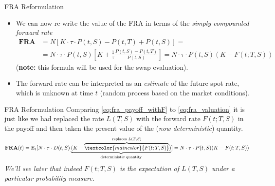 \documentclass{beamer}
\begin{document}
\begin{frame}{FRA Reformulation}
	\begin{itemize}
		\item We can now re-write the value of the FRA in terms of the \emph{simply-compounded forward rate}
		\begin{equation}
			\begin{aligned}
				\textbf{FRA}&=N[K\cdot\tau\cdot P(t,S)-P(t,T)+P(t,S)] = \\
				&=N\cdot\tau\cdot P(t,S) \left[K +\frac{1}{\tau} \frac{P(t,S)-P(t,T)}{P(t,S)}\right] = N\cdot\tau\cdot P(t,S)(K-F(t;T,S))
			\end{aligned}
			\label{eq:fra_payoff_withF}
		\end{equation}
		(\textbf{note:} this formula will be used for the swap evaluation).
		\item<2-> \textcolor{maincolor}{The forward rate can be interpreted as an \emph{estimate} of the future spot rate}, which is unknown at time $t$ (random process based on the market conditions).
	\end{itemize}
\end{frame}

\begin{frame}{FRA Reformulation}
	Comparing \cref{eq:fra_payoff_withF} to \cref{eq:fra_valuation} it is just like we had replaced the rate $L(T,S)$ with the forward rate $F(t;T,S)$ in the payoff and then taken the present value of the (\emph{now deterministic}) quantity.
	\begin{equation*}
		\textbf{FRA}(t) = \mathbb{E}_t [ N\cdot \tau\cdot D(t,S) \underbrace{(K - \overbrace{\textcolor{maincolor}{F(t; T, S)}}^{\text{replaces } L(T,S)})}_{\text{deterministic quantity}}] = N\cdot \tau\cdot P(t,S) (K - F(t; T, S))
	\end{equation*}
	\emph{We'll see later that indeed $F(t;T,S)$ is the expectation of $L(T,S)$ under a particular probability measure.}
\end{frame}
\end{document}
